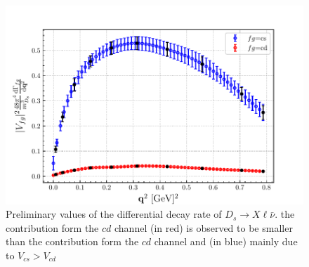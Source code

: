 


\begin{figure}
  \centering
  \includegraphics[scale=0.8]{plots/final_DgammaDq2.pdf}
  \caption{Preliminary values of the differential decay rate of
  $D_s\to X\ell\bar\nu$.
  the contribution form the $cd$ channel (in red) is observed to be smaller than
  the contribution form the $cd$ channel and (in blue) mainly due to $V_{cs}>V_{cd}$ }
  \label{fig:dGammadq_Ds}
\end{figure}

